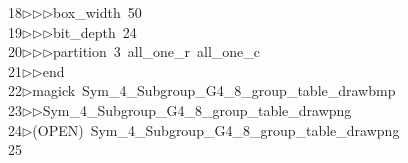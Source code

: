 \begin{tabbing}
18\>$\triangleright$\>$\triangleright$\>$\triangleright$\>box\_width\ 50\ \\[0pt]
19\>$\triangleright$\>$\triangleright$\>$\triangleright$\>bit\_depth\ 24\ \\[0pt]
20\>$\triangleright$\>$\triangleright$\>$\triangleright$\>partition\ 3\ all\_one\_r\ all\_one\_c\ \\[0pt]
21\>$\triangleright$\>$\triangleright$\>end\\[0pt]
22\>$\triangleright$\>magick\ Sym\_4\_Subgroup\_G4\_8\_group\_table\_drawbmp\ \\[0pt]
23\>$\triangleright$\>$\triangleright$\>Sym\_4\_Subgroup\_G4\_8\_group\_table\_drawpng\\[0pt]
24\>$\triangleright$\>(OPEN)\ Sym\_4\_Subgroup\_G4\_8\_group\_table\_drawpng\\[0pt]
25\>\end{tabbing}
